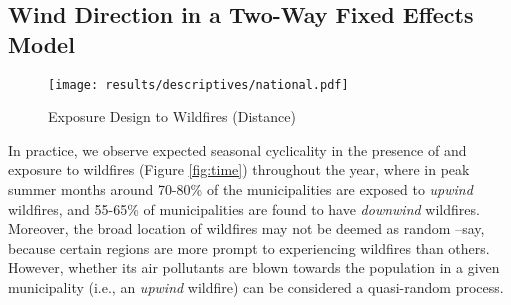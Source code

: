 \documentclass[11pt]{article}
\begin{document}
\begin{spacing}{1.3}



\subsection{Wind Direction in a Two-Way Fixed Effects Model}
\label{sscn:wind}

\begin{figure}
    \centering
    \texttt{[image: results/descriptives/national.pdf]}
    \caption{Exposure Design to Wildfires (Distance)}
    \label{fig:design}
\end{figure}    


In practice, we observe expected seasonal cyclicality in the presence of and exposure to wildfires (Figure \ref{fig:time}) throughout the year, where in peak summer months around 70-80\% of the municipalities are exposed to \textit{upwind} wildfires, and 55-65\% of municipalities are found to have \textit{downwind} wildfires. Moreover, the broad location of wildfires may not be deemed as random --say, because certain regions are more prompt to experiencing wildfires than others. However, whether its air pollutants are blown towards the population in a given municipality (i.e., an \textit{upwind} wildfire) can be considered a quasi-random process. 



\end{spacing}
\end{document}
